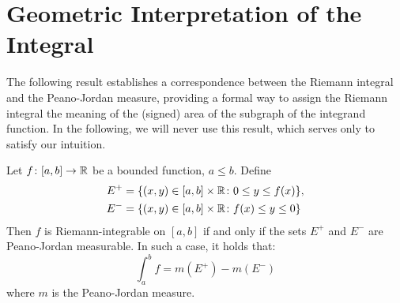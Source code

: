 \section{Geometric Interpretation of the Integral}
%
%

The following result establishes a correspondence between the Riemann integral
and the Peano-Jordan measure, providing a formal way to assign the Riemann
integral the meaning of the (signed) area of the subgraph of the integrand
function. In the following, we will never use this result, which serves only to
satisfy our intuition.

\begin{theorem}
Let $f\colon[a,b]\to {\mathbb R}$ be a bounded function, $a\leq b$. Define 
\begin{align*}
  E^+ &= {\left\{ (x,y)\in [a,b]\times{\mathbb R}\colon 0\le y \le f(x) \right\}}, \\
  E^- &= {\left\{ (x,y)\in [a,b]\times{\mathbb R}\colon f(x)\le y \le 0 \right\}}   
\end{align*}
Then $f$ is Riemann-integrable on $[a,b]$ if and only if the sets $E^+$ and
$E^-$ are Peano-Jordan measurable. In such a case, it holds that:
\[
   \int_a^b f = m(E^+) - m(E^-)  
\]
where $m$ is the Peano-Jordan measure.
\end{theorem}
%
